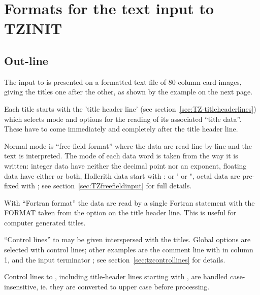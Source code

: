 \chapter{Formats for the text input to TZINIT}
\label{sec:TZFORMATS}

\section{Out-line}

The input to  is presented on a formatted text file
of 80-column card-images,
giving the titles one after the other,
as shown by the example on the next page.

Each title starts with the 'title header line'
 (see section~\ref{sec:TZ-titleheaderlines})
which selects mode and options for the reading of its
associated ``title data''.
These have to come immediately and completely after the
title header line.

Normal mode is ``free-field format'' where the data are read line-by-line
and the text is interpreted.
The mode of each data word is taken from the way it is written:
integer data have neither the decimal point nor an exponent,
floating data have either or both,
Hollerith data start with : or ' or ",
octal data are pre-fixed with ;
see section~\ref{sec:TZfreefieldinput} for full details.

With ``Fortran format'' the data are read by a single
Fortran  statement with the FORMAT taken from the  option on
the title header line.
This is useful for computer generated titles.

``Control lines'' to  may be given interspersed
with the titles.
Global options are selected with control lines;
other examples are the comment line with  \Lit{*--}  in column 1,
and the input terminator ;
see section~\ref{sec:tzcontrollines} for details.

Control lines to , including title-header lines starting
with , are handled case-insensitive, ie. they are converted
to upper case before processing.

